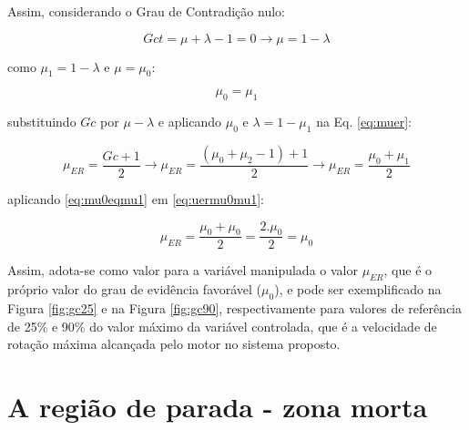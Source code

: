 


\vspace{3cm}

Assim, considerando o Grau de Contradição nulo:

\begin{equation}
Gct = \mu + \lambda - 1 = 0 \rightarrow \mu = 1 - \lambda
\end{equation}

como $\mu_1 = 1 - \lambda$ e $\mu = \mu_0$:

\begin{equation}
\mu_0 = \mu_1
\label{eq:mu0eqmu1}
\end{equation}

substituindo $Gc$ por $\mu-\lambda$ e aplicando $\mu_0$ e $\lambda = 1 - \mu_1$ na Eq. \ref{eq:muer}:

\begin{equation}
\mu_{ER} = \frac{Gc + 1}{2} \rightarrow \mu_{ER} = \frac{(\mu_0 + \mu_2 - 1) + 1}{2} \rightarrow \mu_{ER} = \frac{\mu_0 + \mu_1}{2}
\label{eq:uermu0mu1}
\end{equation}

aplicando \ref{eq:mu0eqmu1} em \ref{eq:uermu0mu1}:

\begin{equation}
\mu_{ER} = \frac{\mu_0 + \mu_0}{2} = \frac{2.\mu_0}{2} = \mu_0
\end{equation}


Assim, adota-se como valor para a variável manipulada 
o valor $\mu_{ER}$, que é o próprio valor do 
grau de evidência favorável ($\mu_0$), 
e pode ser exemplificado na 
Figura \ref{fig:gc25} e na 
Figura \ref{fig:gc90}, 
respectivamente para valores de referência de 25\% e 90\%
do valor máximo da variável controlada, 
que é a velocidade de rotação máxima alcançada 
pelo motor no sistema proposto.










\section{A região de parada - zona morta}

